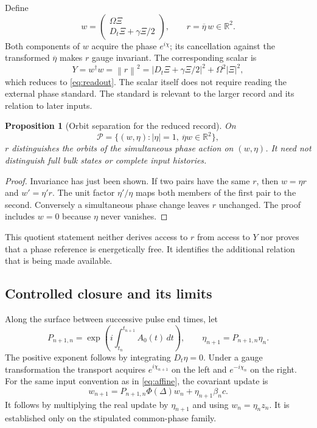 \documentclass[11pt,a4paper]{article}
\newtheorem{proposition}{Proposition}[section]
\theoremstyle{remark}
\newcommand{\norm}[1]{\left\lVert#1\right\rVert}
\newcommand{\R}{\mathbb R}
\begin{document}
Define
\begin{equation}
 w=\begin{pmatrix}\Omega\Xi\\D_t\Xi+\gamma\Xi/2\end{pmatrix},
 \qquad r=\overline\eta\,w\in\R^2.
 \label{eq:relative}
\end{equation}
Both components of $w$ acquire the phase $e^{i\chi}$; its cancellation
against the transformed $\overline\eta$ makes $r$ gauge invariant.
The corresponding scalar is
\begin{equation}
 Y=w^\dagger w=\norm r^2
   =|D_t\Xi+\gamma\Xi/2|^2+\Omega^2|\Xi|^2,
 \label{eq:gauge-scalar}
\end{equation}
which reduces to \eqref{eq:readout}. The scalar itself does not require
reading the external phase standard. The standard is relevant to the
larger record and its relation to later inputs.

\begin{proposition}[Orbit separation for the reduced record]
\label{prop:orbits}
On
\[
 \mathcal P=\{(w,\eta): |\eta|=1,\ \overline\eta w\in\R^2\},
\]
$r$ distinguishes the orbits of the simultaneous phase action on $(w,\eta)$.
It need not distinguish full bulk states or complete input histories.
\end{proposition}
\begin{proof}
Invariance has just been shown. If two pairs have the same $r$, then
$w=\eta r$ and $w'=\eta'r$. The unit factor $\eta'/\eta$ maps both
members of the first pair to the second. Conversely a simultaneous phase
change leaves $r$ unchanged. The proof includes $w=0$ because $\eta$
never vanishes.
\end{proof}

This quotient statement neither derives access to $r$ from access to $Y$
nor proves that a phase reference is energetically free. It identifies
the additional relation that is being made available.

\subsection{Controlled closure and its limits}

Along the surface between successive pulse end times, let
\begin{equation}
 P_{n+1,n}=\exp\left(i\int_{t_n}^{t_{n+1}}A_0(t)\,dt\right),
 \qquad \eta_{n+1}=P_{n+1,n}\eta_n.
 \label{eq:transport}
\end{equation}
The positive exponent follows by integrating $D_t\eta=0$.
Under a gauge transformation the transport acquires
$e^{i\chi_{n+1}}$ on the left and $e^{-i\chi_n}$ on the right.
For the same input convention as in \eqref{eq:affine}, the covariant
update is
\begin{equation}
 w_{n+1}=P_{n+1,n}\Phi(\Delta)w_n+
                     \eta_{n+1}\beta_n c.
 \label{eq:covariant-update}
\end{equation}
It follows by multiplying the real update by $\eta_{n+1}$ and using
$w_n=\eta_n z_n$. It is established only on the stipulated common-phase
family.
\end{document}
